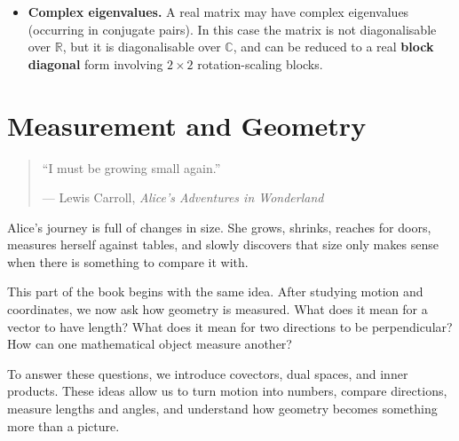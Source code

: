 \documentclass[11pt,openany]{book}
\theoremstyle{definition}
\begin{document}
\begin{itemize}
meaning there is only \textbf{one independent eigendirection}, even though the matrix acts on a two-dimensional space.

\medskip

Because we cannot find two linearly independent eigenvectors, the matrix cannot be diagonalised.
  \item \textbf{Complex eigenvalues.} A real matrix may have complex eigenvalues
  (occurring in conjugate pairs). In this case the matrix is not diagonalisable
  over $\mathbb{R}$, but it is diagonalisable over $\mathbb{C}$, and can be
  reduced to a real \textbf{block diagonal} form involving $2\times 2$ rotation-scaling
  blocks.
\end{itemize}

\medskip




\part{Measurement and Geometry}
\vspace*{0.35\textheight}

\begin{quote}
\centering
``I must be growing small again.''

\medskip

--- Lewis Carroll, \textit{Alice's Adventures in Wonderland}
\end{quote}



Alice's journey is full of changes in size. She grows, shrinks, reaches for doors,
measures herself against tables, and slowly discovers that size only makes sense when
there is something to compare it with.

\medskip

This part of the book begins with the same idea. After studying motion and coordinates,
we now ask how geometry is measured. What does it mean for a vector to have length?
What does it mean for two directions to be perpendicular? How can one mathematical object
measure another?

\medskip

To answer these questions, we introduce covectors, dual spaces, and inner products. These
ideas allow us to turn motion into numbers, compare directions, measure lengths and
angles, and understand how geometry becomes something more than a picture.
\end{document}
